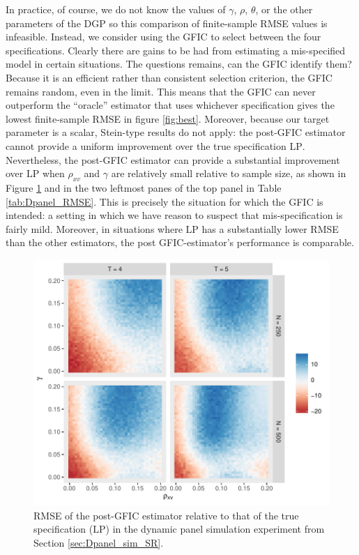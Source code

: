 In practice, of course, we do not know the values of $\gamma$, $\rho$, $\theta$, or the other parameters of the DGP so this comparison of finite-sample RMSE values is infeasible.
Instead, we consider using the GFIC to select between the four specifications.
Clearly there are gains to be had from estimating a mis-specified model in certain situations.
The questions remains, can the GFIC identify them?
Because it is an efficient rather than consistent selection criterion, the GFIC remains random, even in the limit.
This means that the GFIC can never outperform the ``oracle'' estimator that uses whichever specification gives the lowest finite-sample RMSE in figure \ref{fig:best}.
Moreover, because our target parameter is a scalar, Stein-type results do not apply: the post-GFIC estimator cannot provide a uniform improvement over the true specification $\text{LP}$.
Nevertheless, the post-GFIC estimator can provide a substantial improvement over $\text{LP}$ when $\rho_{xv}$ and $\gamma$ are relatively small relative to sample size, as shown in Figure \ref{fig:GFIC_rel_LP} and in the two leftmost panes of the top panel in Table \ref{tab:Dpanel_RMSE}.
This is precisely the situation for which the GFIC is intended: a setting in which we have reason to suspect that mis-specification is fairly mild.
Moreover, in situations where $\text{LP}$ has a substantially lower RMSE than the other estimators, the post GFIC-estimator's performance is comparable.

\begin{figure}
\centering
\includegraphics[scale = 0.8]{./simulations/DynamicPanel/results/Dpanel_GFIC_RMSE_rel_LP}
\caption{RMSE of the post-GFIC estimator relative to that of the true specification ($\text{LP}$) in the dynamic panel simulation experiment from Section \ref{sec:Dpanel_sim_SR}.}
\label{fig:GFIC_rel_LP}
\end{figure}

